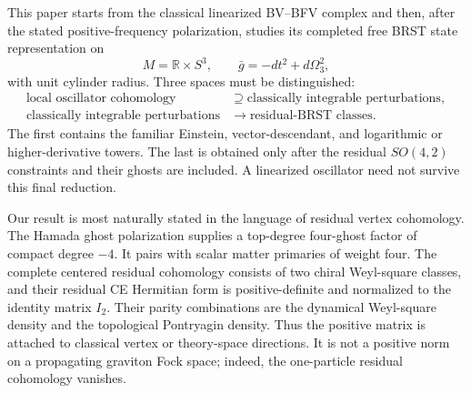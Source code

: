 \documentclass[11pt]{article}
\theoremstyle{definition}
\theoremstyle{remark}
\newcommand{\R}{\mathbb R}
\begin{document}
This paper starts from the classical linearized BV--BFV complex and then,
after the stated positive-frequency polarization, studies its completed free
BRST state representation on
\begin{equation}
 M=\R\times S^3,
 \qquad
 \bar g=-dt^2+d\Omega_3^2,
\end{equation}
with unit cylinder radius.  Three spaces must be distinguished:
\begin{equation}\label{eq:three-levels}
 \begin{aligned}
 \text{local oscillator cohomology}
 &\supseteq \text{classically integrable perturbations},\\
 \text{classically integrable perturbations}
 &\longrightarrow \text{residual-BRST classes}.
 \end{aligned}
\end{equation}
The first contains the familiar Einstein, vector-descendant, and logarithmic
or higher-derivative towers.  The last is obtained only after the residual
$SO(4,2)$ constraints and their ghosts are included.  A linearized
oscillator need not survive this final reduction.

Our result is most naturally stated in the language of residual vertex
cohomology.  The Hamada ghost polarization supplies a top-degree four-ghost
factor of compact degree $-4$.  It pairs with scalar matter primaries of
weight four.  The complete centered residual cohomology consists of two
chiral Weyl-square classes, and their residual CE Hermitian form is
positive-definite and normalized to the identity matrix $I_2$.  Their parity
combinations are the dynamical
Weyl-square density and the topological Pontryagin density.  Thus the
positive matrix is attached to classical vertex or theory-space directions.
It is not a positive norm on a propagating graviton Fock space; indeed, the
one-particle residual cohomology vanishes.
\end{document}
